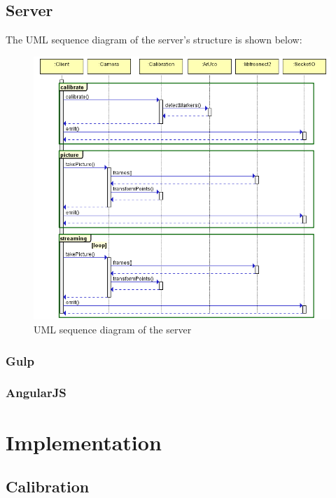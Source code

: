 \documentclass{article}
\begin{document}
\subsection{Server}
The UML sequence diagram of the server's structure is shown below:
\begin{figure}[h]
  \centering
  \includegraphics[scale=0.7]{clientUML}
  \caption{UML sequence diagram of the server}
\end{figure}
\subsubsection{Gulp} %
\subsubsection{AngularJS}

\newpage
\section{Implementation}
\subsection{Calibration}
\end{document}
